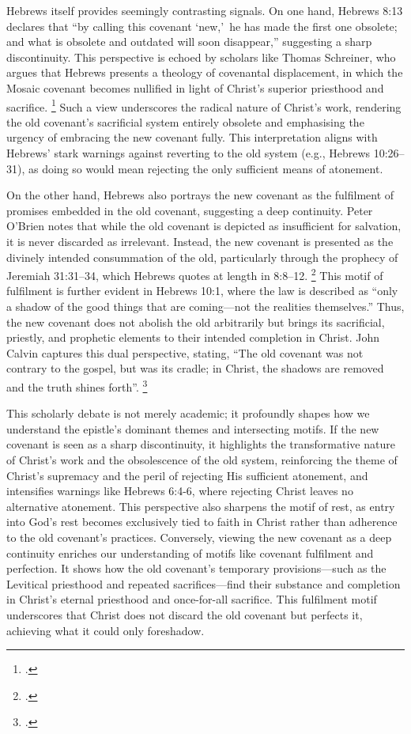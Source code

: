 \documentclass[12pt]{article}
\begin{document}
Hebrews itself provides seemingly contrasting signals. On one hand, Hebrews 8:13
declares that ``by calling this covenant \lq{}new,\rq\ he has made the first one
obsolete; and what is obsolete and outdated will soon disappear,'' suggesting a
sharp discontinuity. This perspective is echoed by scholars like Thomas
Schreiner, who argues that Hebrews presents a theology of covenantal
displacement, in which the Mosaic covenant becomes nullified in light of
Christ’s superior priesthood and sacrifice. \footcite[204]{Schreiner2017}
Such a view underscores the radical nature of Christ’s work, rendering the old
covenant’s sacrificial system entirely obsolete and emphasising the urgency of
embracing the new covenant fully.
This interpretation aligns with Hebrews’ stark warnings against reverting to the
old system (e.g., Hebrews 10:26--31), as doing so would mean rejecting the only
sufficient means of atonement.

On the other hand, Hebrews also portrays the new covenant as the fulfilment of
promises embedded in the old covenant, suggesting a deep continuity. Peter
O’Brien notes that while the old covenant is depicted as insufficient for
salvation, it is never discarded as irrelevant. Instead, the new covenant is
presented as the divinely intended consummation of the old, particularly through
the prophecy of Jeremiah 31:31--34, which Hebrews quotes at length in 8:8--12.
\footcite[296]{OBrien2010}
This motif of fulfilment is further evident in Hebrews
10:1, where the law is described as ``only a shadow of the good things that are
coming---not the realities themselves.'' Thus, the new covenant does not abolish
the old arbitrarily but brings its sacrificial, priestly, and prophetic elements
to their intended completion in Christ. John Calvin captures this dual
perspective, stating, ``The old covenant was not contrary to the gospel, but was
its cradle; in Christ, the shadows are removed and the truth shines forth''.
\footcite[45]{Calvin1853}

This scholarly debate is not merely academic; it profoundly shapes how we
understand the epistle’s dominant themes and intersecting motifs.
%
If the new covenant is seen as a sharp discontinuity, it highlights the
transformative nature of Christ’s work and the obsolescence of the old system,
reinforcing the theme of Christ’s supremacy and the peril of rejecting His
sufficient atonement, and intensifies warnings like Hebrews 6:4-6, where
rejecting Christ leaves no alternative atonement.
%
This perspective also sharpens the motif of rest, as entry into God’s rest
becomes exclusively tied to faith in Christ rather than adherence to the old
covenant’s practices.
%
Conversely, viewing the new covenant as a deep continuity enriches our
understanding of motifs like covenant fulfilment and perfection.
%
It shows how the old covenant’s temporary provisions—such as the Levitical
priesthood and repeated sacrifices—find their substance and completion in
Christ’s eternal priesthood and once-for-all sacrifice.
%
This fulfilment motif underscores that Christ does not discard the old covenant
but perfects it, achieving what it could only foreshadow.
\end{document}
